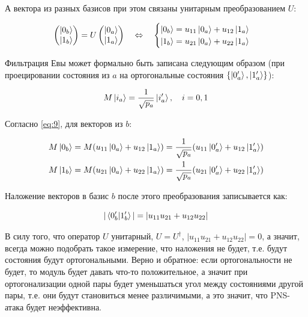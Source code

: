 \documentclass[a4paper, 12pt]{article}
\newcommand{\qlrq}
{\ensuremath{\quad \Leftrightarrow \quad}} %
\begin{document}
А вектора из разных базисов при этом связаны унитарным преобразованием $U$:

\begin{equation}
	\begin{pmatrix}
		\ket{0_b}	\\
		\ket{1_b}
	\end{pmatrix}
	= U
	\begin{pmatrix}
		\ket{0_a}	\\
		\ket{1_a}
	\end{pmatrix} \qlrq 
	\begin{cases}
		\ket{0_b} = u_{11} \ket{0_a} + u_{12} \ket{1_a}\\
		\ket{1_b} = u_{21}\ket{0_a} + u_{22} \ket{1_a}
	\end{cases}
	\label{eq:9}
\end{equation}

Фильтрация Евы может формально быть записана следующим образом (при проецировании состояния из $a$ на ортогональные состояния $\{\ket{0_a'}, \ket{1_a'}\}$):

\begin{equation}
	M\ket{i_a} = \frac{1}{\sqrt{p_a}}\ket{i_a'}, \quad i = 0, 1
\end{equation}

Согласно \ref{eq:9}, для векторов из $b$:

\begin{align}
	M\ket{0_b} = M (u_{11}\ket{0_a} + u_{12} \ket{1_a}) = \frac{1}{\sqrt{p_a}} (u_{11} \ket{0_a'} + u_{12} \ket{1_a'}) \\ 
	M\ket{1_b} = M (u_{21}\ket{0_a} + u_{22} \ket{1_a}) = \frac{1}{\sqrt{p_a}} (u_{21} \ket{0_a'} + u_{22} \ket{1_a'})
\end{align}

Наложение векторов в базис $b$ после этого преобразования записывается как:

\begin{equation}
	|\braket{0_b'|1_b'}| = |u_{11} u_{21} + u_{12} u_{22}|
\end{equation}

В силу того, что оператор $U$ унитарный, $U = U^\dagger$, $|u_{11} u_{21} + u_{12} u_{22}| = 0$, а значит, всегда можно подобрать такое измерение, что наложения не будет, т.е. будут состояния будут ортогональными. Верно и обратное: если ортогональности не будет, то модуль будет давать что-то положительное, а значит при ортогонализации одной пары будет уменьшаться угол между состояниями другой пары, т.е. они будут становиться менее различимыми, а это значит, что PNS-атака будет неэффективна.
\end{document}

